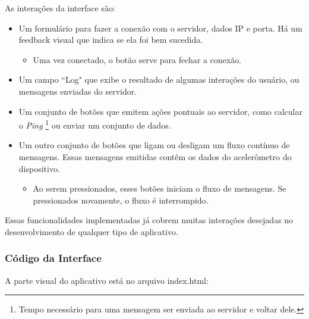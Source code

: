 \documentclass[a4paper,12pt]{article}
\begin{document}
As interações da interface são:

\begin{itemize}
\item Um formulário para fazer a conexão com o servidor, dados IP e porta. Há um feedback visual que indica se ela foi bem sucedida.

\begin{itemize}
\item Uma vez conectado, o botão serve para fechar a conexão.
\end{itemize}

\item Um campo “Log" que exibe o resultado de algumas interações do usuário, ou mensagens enviadas do servidor.

\item Um conjunto de botões que emitem ações pontuais ao servidor, como calcular o \emph{Ping} \footnote{Tempo necessário para uma mensagem ser enviada ao servidor e voltar dele.} ou enviar um conjunto de dados.

\item Um outro conjunto de botões que ligam ou desligam um fluxo contínuo de mensagens. Essas mensagens emitidas contêm os dados do acelerômetro do dispositivo.

\begin{itemize}
\item Ao serem pressionados, esses botões iniciam o fluxo de mensagens. Se pressionados novamente, o fluxo é interrompido.
\end{itemize}

\end{itemize}

Essas funcionalidades implementadas já cobrem muitas interações desejadas no desenvolvimento de qualquer tipo de aplicativo.


\subsubsection{Código da Interface}
A parte visual do aplicativo está no arquivo index.html:
\end{document}
